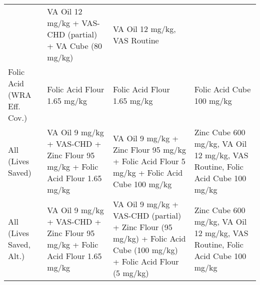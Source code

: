 \documentclass[
]{article}
\begin{document}
\begin{longtable}[]{@{}llll@{}}
\begin{minipage}[t]{0.22\columnwidth}
\end{minipage} & \begin{minipage}[t]{0.22\columnwidth}\raggedright
VA Oil 12 mg/kg + VAS-CHD (partial) + VA Cube (80 mg/kg)\strut
\end{minipage} & \begin{minipage}[t]{0.28\columnwidth}\raggedright
VA Oil 12 mg/kg, VAS Routine\strut
\end{minipage}\tabularnewline
\begin{minipage}[t]{0.18\columnwidth}\raggedright
Folic Acid (WRA Eff. Cov.)\strut
\end{minipage} & \begin{minipage}[t]{0.22\columnwidth}\raggedright
Folic Acid Flour 1.65 mg/kg\strut
\end{minipage} & \begin{minipage}[t]{0.22\columnwidth}\raggedright
Folic Acid Flour 1.65 mg/kg\strut
\end{minipage} & \begin{minipage}[t]{0.28\columnwidth}\raggedright
Folic Acid Cube 100 mg/kg\strut
\end{minipage}\tabularnewline
\begin{minipage}[t]{0.18\columnwidth}\raggedright
All (Lives Saved)\strut
\end{minipage} & \begin{minipage}[t]{0.22\columnwidth}\raggedright
VA Oil 9 mg/kg + VAS-CHD + Zinc Flour 95 mg/kg + Folic Acid Flour 1.65
mg/kg\strut
\end{minipage} & \begin{minipage}[t]{0.22\columnwidth}\raggedright
VA Oil 9 mg/kg + Zinc Flour 95 mg/kg + Folic Acid Flour 5 mg/kg + Folic
Acid Cube 100 mg/kg\strut
\end{minipage} & \begin{minipage}[t]{0.28\columnwidth}\raggedright
Zinc Cube 600 mg/kg, VA Oil 12 mg/kg, VAS Routine, Folic Acid Cube 100
mg/kg\strut
\end{minipage}\tabularnewline
\begin{minipage}[t]{0.18\columnwidth}\raggedright
All (Lives Saved, Alt.)\strut
\end{minipage} & \begin{minipage}[t]{0.22\columnwidth}\raggedright
VA Oil 9 mg/kg + VAS-CHD + Zinc Flour 95 mg/kg + Folic Acid Flour 1.65
mg/kg\strut
\end{minipage} & \begin{minipage}[t]{0.22\columnwidth}\raggedright
VA Oil 9 mg/kg + VAS-CHD (partial) + Zinc Flour (95 mg/kg) + Folic Acid
Cube (100 mg/kg) + Folic Acid Flour (5 mg/kg)\strut
\end{minipage} & \begin{minipage}[t]{0.28\columnwidth}\raggedright
Zinc Cube 600 mg/kg, VA Oil 12 mg/kg, VAS Routine, Folic Acid Cube 100
mg/kg\strut
\end{minipage}\tabularnewline
\bottomrule
\end{longtable}
\end{document}
